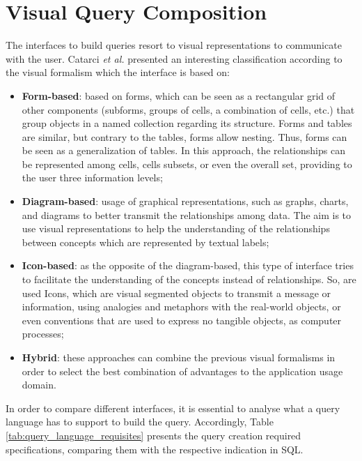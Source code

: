 \section{Visual Query Composition}
\label{sec:visual_query_composition}

The interfaces to build queries resort to visual representations to communicate with the user. Catarci \textit{et al.} \cite{visualQuerySystemsForDatabases_aSurvey} presented an interesting classification according to the visual formalism which the interface is based on:

\begin{itemize}
    \item \textbf{Form-based}: based on forms, which can be seen as a rectangular grid of other components (subforms, groups of cells, a combination of cells, etc.) that group objects in a named collection regarding its structure. Forms and tables are similar,  but contrary to the tables, forms allow nesting. Thus, forms can be seen as a generalization of tables. In this approach, the relationships can be represented among cells, cells subsets, or even the overall set, providing to the user three information levels; %
    \item \textbf{Diagram-based}: usage of graphical representations, such as graphs, charts, and diagrams to better transmit the relationships among data. The aim is to use visual representations to help the understanding of the relationships between concepts which are represented by textual labels;
    \item \textbf{Icon-based}: as the opposite of the diagram-based, this type of interface tries to facilitate the understanding of the concepts instead of relationships. So, are used Icons, which are visual segmented objects to transmit a message or information, using analogies and metaphors with the real-world objects, or even conventions that are used to express no tangible objects, as computer processes;
    \item \textbf{Hybrid}: these approaches can combine the previous visual formalisms in order to select the best combination of advantages to the application usage domain.
\end{itemize}

In order to compare different interfaces, it is essential to analyse what a query language has to support to build the query. Accordingly, Table \ref{tab:query_language_requisites} presents the query creation required specifications, comparing them with the respective indication in SQL.

